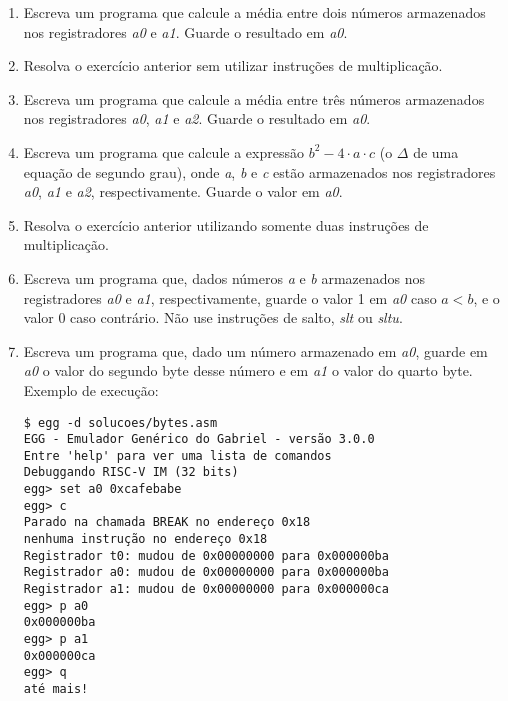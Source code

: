\documentclass{article}
\begin{document}
\begin{enumerate}
  \item Escreva um programa que calcule a média entre dois números armazenados
  nos registradores \textit{a0} e \textit{a1}. Guarde o resultado em
  \textit{a0}.

  \item Resolva o exercício anterior sem utilizar instruções de multiplicação.

  \item Escreva um programa que calcule a média entre três números armazenados
  nos registradores \textit{a0}, \textit{a1} e \textit{a2}. Guarde o resultado
  em \textit{a0}.

  \item Escreva um programa que calcule a expressão $b^2 - 4 \cdot a \cdot c$ (o
  $\Delta$ de uma equação de segundo grau), onde \textit{a}, \textit{b} e
  \textit{c} estão armazenados nos registradores \textit{a0}, \textit{a1} e
  \textit{a2}, respectivamente. Guarde o valor em \textit{a0}.

  \item Resolva o exercício anterior utilizando somente duas instruções de
  multiplicação.

  \item Escreva um programa que, dados números \textit{a} e \textit{b}
  armazenados nos registradores \textit{a0} e \textit{a1}, respectivamente,
  guarde o valor 1 em \textit{a0} caso $a < b$, e o valor 0 caso contrário. Não
  use instruções de salto, \textit{slt} ou \textit{sltu}.

  \item Escreva um programa que, dado um número armazenado em \textit{a0},
  guarde em \textit{a0} o valor do segundo byte desse número e em \textit{a1} o
  valor do quarto byte. Exemplo de execução:

  \begin{verbatim}
$ egg -d solucoes/bytes.asm
EGG - Emulador Genérico do Gabriel - versão 3.0.0
Entre 'help' para ver uma lista de comandos
Debuggando RISC-V IM (32 bits)
egg> set a0 0xcafebabe
egg> c
Parado na chamada BREAK no endereço 0x18
nenhuma instrução no endereço 0x18
Registrador t0: mudou de 0x00000000 para 0x000000ba
Registrador a0: mudou de 0x00000000 para 0x000000ba
Registrador a1: mudou de 0x00000000 para 0x000000ca
egg> p a0
0x000000ba
egg> p a1
0x000000ca
egg> q
até mais!
  \end{verbatim}


\end{enumerate}
\end{document}
